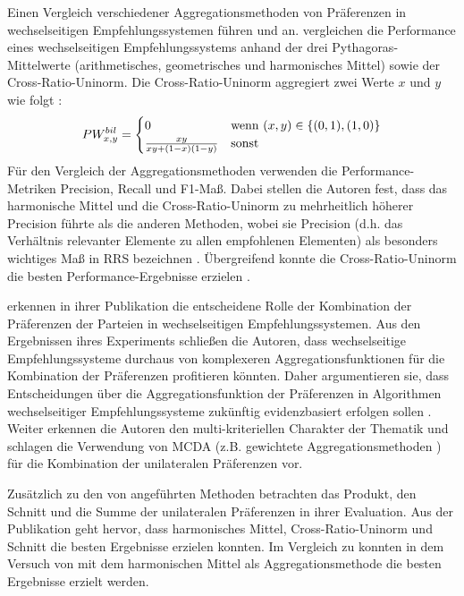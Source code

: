 Einen Vergleich verschiedener Aggregationsmethoden von Präferenzen in wechselseitigen Empfehlungssystemen führen \textcite[S. 4031ff.]{neve:inproceedings} und \textcite[S. 1ff.]{kumari:2:inproceedings} an.
\textcite[S. 4031ff.]{neve:inproceedings} vergleichen die Performance eines wechselseitigen Empfehlungssystems anhand der drei Pythagoras-Mittelwerte (arithmetisches, geometrisches und harmonisches Mittel) sowie der Cross-Ratio-Uninorm.
Die Cross-Ratio-Uni\-norm aggregiert zwei Werte $x$ und $y$ wie folgt \cite[S. 19]{appel:article}:
\begin{equation}\label{eq35}
    PW_{x,y}^{bil} =
        \begin{cases}
            0 & \textnormal{wenn } (x,y) \in \{(0,1),(1,0)\} \\
            \frac{xy}{xy + (1-x) (1-y)} & \textnormal{sonst } \\
        \end{cases}
\end{equation}
Für den Vergleich der Aggregationsmethoden verwenden \textcite[S. 4034]{neve:inproceedings} die Performance-Metriken Precision, Recall und F1-Maß.
Dabei stellen die Autoren fest, dass das harmonische Mittel und die Cross-Ratio-Uninorm zu mehrheitlich höherer Precision führte als die anderen Methoden, wobei sie Precision (d.h. das Verhältnis relevanter Elemente zu allen empfohlenen Elementen) als besonders wichtiges Maß in \ac{RRS} bezeichnen \cite[S. 4035]{neve:inproceedings}.
Übergreifend konnte die Cross-Ratio-Uninorm die besten Performance-Ergebnisse erzielen \cite[S. 4035]{neve:inproceedings}.

\textcite[S. 4031]{neve:inproceedings} erkennen in ihrer Publikation die entscheidene Rolle der Kombination der Präferenzen der Parteien in wechselseitigen Empfehlungssystemen.
Aus den Ergebnissen ihres Experiments schließen die Autoren, dass wechselseitige Empfehlungssysteme durchaus von komplexeren Aggregationsfunktionen für die Kombination der Präferenzen profitieren könnten.
Daher argumentieren sie, dass Entscheidungen über die Aggregationsfunktion der Präferenzen in Algorithmen wechselseitiger Empfehlungssysteme zukünftig evidenzbasiert erfolgen sollen \cite[S. 4032]{neve:inproceedings}.
Weiter erkennen die Autoren den multi-kriteriellen Charakter der Thematik und schlagen die Verwendung von \ac{MCDA} (z.B. gewichtete Aggregationsmethoden \cite[S. 4036]{neve:inproceedings}) für die Kombination der unilateralen Präferenzen vor.

Zusätzlich zu den von \textcite[S. 4031ff.]{neve:inproceedings} angeführten Methoden betrachten \textcite[S. 1ff.]{kumari:2:inproceedings} das Produkt, den Schnitt und die Summe der unilateralen Präferenzen in ihrer Evaluation.
Aus der Publikation geht hervor, dass harmonisches Mittel, Cross-Ratio-Uninorm und Schnitt die besten Ergebnisse erzielen konnten.
Im Vergleich zu \textcite[S. 4031ff.]{neve:inproceedings} konnten in dem Versuch von \textcite[S. 5]{kumari:2:inproceedings} mit dem harmonischen Mittel als Aggregationsmethode die besten Ergebnisse erzielt werden.

